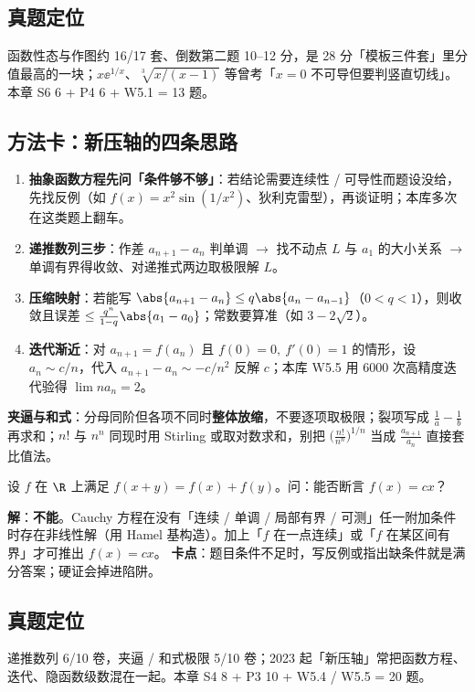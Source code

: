 \subsection{真题定位}
函数性态与作图约 16/17 套、倒数第二题 10--12 分，是 28 分「模板三件套」里分值最高的一块；$x\ee^{1/x}$、$\sqrt[3]{x/(x-1)}$ 等曾考「$x=0$ 不可导但要判竖直切线」。本章 S6 6 + P4 6 + W5.1 = 13 题。

\subsection{方法卡：新压轴的四条思路}

\begin{enumerate}
\item \textbf{抽象函数方程先问「条件够不够」}：若结论需要连续性 / 可导性而题设没给，先找反例（如 $f(x)=x^{2}\sin(1/x^{2})$、狄利克雷型），再谈证明；本库多次在这类题上翻车。
\item \textbf{递推数列三步}：作差 $a_{n+1}-a_{n}$ 判单调 $\to$ 找不动点 $L$ 与 $a_1$ 的大小关系 $\to$ 单调有界得收敛、对递推式两边取极限解 $L$。
\item \textbf{压缩映射}：若能写 $\abs{a_{n+1}-a_{n}}\le q\abs{a_{n}-a_{n-1}}$（$0<q<1$），则收敛且误差 $\le\frac{q^{n}}{1-q}\abs{a_1-a_0}$；常数要算准（如 $3-2\sqrt2$）。
\item \textbf{迭代渐近}：对 $a_{n+1}=f(a_n)$ 且 $f(0)=0,\ f'(0)=1$ 的情形，设 $a_n\sim c/n$，代入 $a_{n+1}-a_n\sim -c/n^{2}$ 反解 $c$；本库 W5.5 用 6000 次高精度迭代验得 $\lim n a_n=2$。
\end{enumerate}

\noindent\textbf{夹逼与和式}：分母同阶但各项不同时\textbf{整体放缩}，不要逐项取极限；裂项写成 $\frac1a-\frac1b$ 再求和；$n!$ 与 $n^n$ 同现时用 Stirling 或取对数求和，别把 $\big(\frac{n!}{n^n}\big)^{1/n}$ 当成 $\frac{a_{n+1}}{a_n}$ 直接套比值法。

\begin{keypoint}
设 $f$ 在 $\R$ 上满足 $f(x+y)=f(x)+f(y)$。问：能否断言 $f(x)=cx$？

\noindent\textbf{解}：\textbf{不能}。Cauchy 方程在没有「连续 / 单调 / 局部有界 / 可测」任一附加条件时存在非线性解（用 Hamel 基构造）。加上「$f$ 在一点连续」或「$f$ 在某区间有界」才可推出 $f(x)=cx$。
\textbf{卡点}：题目条件不足时，写反例或指出缺条件就是满分答案；硬证会掉进陷阱。
\end{keypoint}

\subsection{真题定位}
递推数列 6/10 卷，夹逼 / 和式极限 5/10 卷；2023 起「新压轴」常把函数方程、迭代、隐函数级数混在一起。本章 S4 8 + P3 10 + W5.4 / W5.5 = 20 题。

